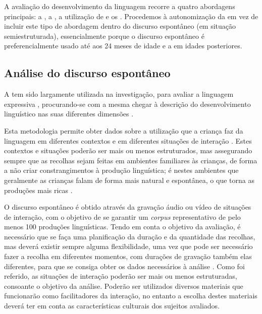 \documentclass[output=paper]{LSP/langsci}
\begin{document}
A avaliação do desenvolvimento da linguagem recorre a quatro abordagens principais: a , a , a utilização de  e os  \citep{acosta_etal2013,condouris_etal2003,creasey2006}. Procedemos à autonomização da  em vez de incluir este tipo de abordagem dentro do discurso espontâneo (em situação semiestruturada), essencialmente porque o discurso espontâneo é preferencialmente usado até aos 24 meses de idade e a  em idades posteriores.

\subsection{Análise do discurso espontâneo}
\label{subsec:viana_analise_disc_espont}

A  tem sido largamente utilizada na investigação, para avaliar a linguagem expressiva \citep{condouris_etal2003}, procurando-se com a mesma chegar à descrição do desenvolvimento linguístico nas suas diferentes dimensões \citep{acosta2006}.

Esta metodologia permite obter dados sobre a utilização que a criança faz da linguagem em diferentes contextos e em diferentes situações de interação \citep{condouris_etal2003}. Estes contextos e situações poderão ser mais ou menos estruturados, mas assegurando sempre que as recolhas sejam feitas em ambientes familiares às crianças, de forma a não criar constrangimentos à produção linguística; é nestes ambientes que geralmente as crianças falam de forma mais natural e espontânea, o que torna as produções mais ricas \citep{creasey2006,puyuelo2003}.

O discurso espontâneo é obtido através da gravação áudio ou vídeo de situações de interação, com o objetivo de se garantir um \textit{corpus} representativo de pelo menos 100 produções linguísticas. Tendo em conta o objetivo da avaliação, é necessário que se faça uma planificação da duração e da quantidade das recolhas, mas deverá existir sempre alguma flexibilidade, uma vez que pode ser necessário fazer a recolha em diferentes momentos, com durações de gravação também elas diferentes, para que se consiga obter os dados necessários à análise \citep{demuth1998}. Como foi referido, as situações de interação poderão ser mais ou menos estruturadas, consoante o objetivo da análise. Poderão ser utilizados diversos materiais que funcionarão como facilitadores da interação, no entanto a escolha destes materiais deverá ter em conta as características culturais dos sujeitos avaliados. 
\end{document}
